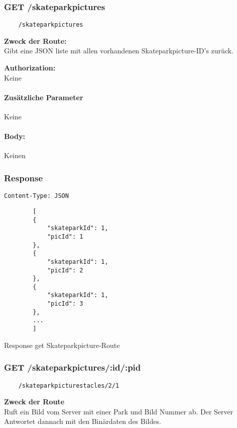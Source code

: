 \label{/skateparkpictures}

\subsubsection{GET /skateparkpictures}

\begin{lstlisting}
    /skateparkpictures
\end{lstlisting}

\textbf{Zweck der Route:} \\
Gibt  eine JSON liste mit allen vorhandenen Skateparkpicture-ID's zurück.

\textbf{Authorization:} \\
Keine

\paragraph{Zusätzliche Parameter}
Keine

\paragraph{Body:}

Keinen

\subsubsection{Response}
\begin{code}
    \lstinline{Content-Type: JSON}
    \begin{lstlisting}
        [
        {
            "skateparkId": 1,
            "picId": 1
        },
        {
            "skateparkId": 1,
            "picId": 2
        },
        {
            "skateparkId": 1,
            "picId": 3
        },
        ... 
        ]
    \end{lstlisting}
    \caption{Response get Skateparkpicture-Route}
\end{code}

\pagebreak

\subsubsection{GET /skateparkpictures/:id/:pid}

\begin{lstlisting}
    /skateparkpicturestacles/2/1
\end{lstlisting}

\textbf{Zweck der Route} \\
Ruft ein Bild vom Server mit einer Park und Bild Nummer ab. Der Server Antwortet
dannach mit den Binärdaten des Bildes.




